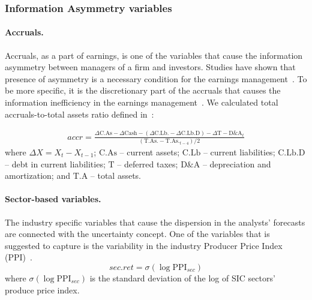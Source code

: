 \subsubsection{Information Asymmetry variables}
\paragraph{Accruals.}
Accruals, as a part of  earnings, is one of the variables that cause the information asymmetry between managers of a firm and investors. Studies have shown that presence of asymmetry is a necessary condition for the earnings management~\citep{trueman1988,richardson2000}. To be more specific, it is the discretionary part of the accruals that causes  the information inefficiency  in the earnings management~\citep{richardson2000,ahmed2005}. We calculated total accruals-to-total assets ratio defined in~\cite{creamer2009}:

\begin{eqnarray}
accr=\frac{\Delta \mathrm{C.As} - \Delta \mathrm{Cash} - (\Delta \mathrm{C.Lb.} - \Delta \mathrm{C.Lb.D}) - \Delta \mathrm{T} - \mathrm{D}\& \mathrm{A}_t}{(\mathrm{T.As.} - \mathrm{T.As.}_{t-4})/2}
\end{eqnarray}
where $\Delta X=X_t-X_{t-1}$; $\mathrm{C.As}$ -- current assets; $\mathrm{C.Lb}$ -- current liabilities; $\mathrm{C.Lb.D}$ -- debt in current liabilities; $\mathrm{T}$ -- deferred taxes; $\mathrm{D}\&\mathrm{A}$ -- depreciation and amortization; and $\mathrm{T.A}$ -- total assets.



\paragraph{Sector-based variables.} The industry specific variables that cause the dispersion in the analysts' forecasts are connected  with the uncertainty concept. One of the variables that is suggested to capture is the variability in the industry Producer Price Index (PPI)~\citep{henley2003}.
\begin{equation}
sec.ret = \sigma (\log \mathrm{PPI}_{sec})
\end{equation}
where $\sigma (\log \mathrm{PPI}_{sec})$ is the standard deviation of the log of SIC sectors' produce price index.


